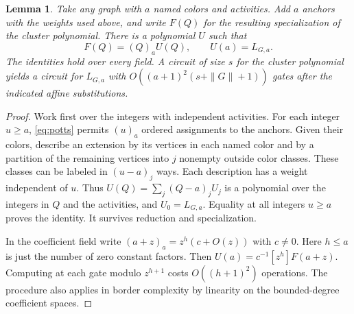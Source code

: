 \documentclass[11pt]{article}
\newtheorem{lemma}[theorem]{Lemma}
\theoremstyle{definition}
\begin{document}
\begin{lemma}\label{lem:anchors}
Take any graph with \(a\) named colors and activities. Add \(a\) anchors with the weights used above, and write \(F(Q)\) for the resulting specialization of the cluster polynomial. There is a polynomial \(U\) such that
\[
 F(Q)=(Q)_a U(Q),\qquad U(a)=L_{G,a} .
\]
The identities hold over every field. A circuit of size \(s\) for the cluster polynomial yields a circuit for \(L_{G,a}\) with \(O((a+1)^2(s+\|G\|+1))\) gates after the indicated affine substitutions.
\end{lemma}
\begin{proof}
Work first over the integers with independent activities. For each integer \(u\ge a\), \eqref{eq:potts} permits \((u)_a\) ordered assignments to the anchors. Given their colors, describe an extension by its vertices in each named color and by a partition of the remaining vertices into \(j\) nonempty outside color classes. These classes can be labeled in \((u-a)_j\) ways. Each description has a weight independent of \(u\). Thus \(U(Q)=\sum_j (Q-a)_j U_j\) is a polynomial over the integers in \(Q\) and the activities, and \(U_0=L_{G,a}\). Equality at all integers \(u\ge a\) proves the identity. It survives reduction and specialization.

In the coefficient field write \((a+z)_a=z^h(c+O(z))\) with \(c\ne0\). Here \(h\le a\) is just the number of zero constant factors. Then \(U(a)=c^{-1}[z^h]F(a+z)\). Computing at each gate modulo \(z^{h+1}\) costs \(O((h+1)^2)\) operations. The procedure also applies in border complexity by linearity on the bounded-degree coefficient spaces.
\end{proof}
\end{document}
